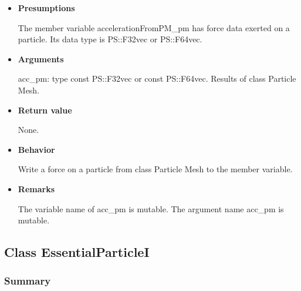 \begin{itemize}

\item {\bf Presumptions}

  The member variable accelerationFromPM\_pm has force data exerted on
  a particle. Its data type is PS::F32vec or PS::F64vec.

\item {\bf Arguments}

  acc\_pm: type const PS::F32vec or const PS::F64vec. Results of class
  Particle Mesh.

\item {\bf Return value}

  None.
  
\item {\bf Behavior}

  Write a force on a particle from class Particle Mesh to the member
  variable.
  
\item {\bf Remarks}

  The variable name of acc\_pm is mutable. The argument name acc\_pm
  is mutable.

\end{itemize}

\subsection{Class EssentialParticleI}
\label{sec:example_essentialparticlei}

\subsubsection{Summary}

